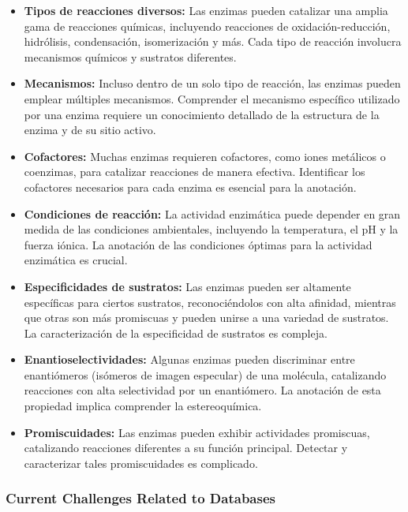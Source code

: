 \documentclass[12pt]{article}
\begin{document}
\begin{itemize}
\item \textbf{Tipos de reacciones diversos:} Las enzimas pueden catalizar una amplia gama de reacciones químicas, incluyendo reacciones de oxidación-reducción, hidrólisis, condensación, isomerización y más. Cada tipo de reacción involucra mecanismos químicos y sustratos diferentes.

\item \textbf{Mecanismos:} Incluso dentro de un solo tipo de reacción, las enzimas pueden emplear múltiples mecanismos. Comprender el mecanismo específico utilizado por una enzima requiere un conocimiento detallado de la estructura de la enzima y de su sitio activo.

\item \textbf{Cofactores:} Muchas enzimas requieren cofactores, como iones metálicos o coenzimas, para catalizar reacciones de manera efectiva. Identificar los cofactores necesarios para cada enzima es esencial para la anotación.

\item \textbf{Condiciones de reacción:} La actividad enzimática puede depender en gran medida de las condiciones ambientales, incluyendo la temperatura, el pH y la fuerza iónica. La anotación de las condiciones óptimas para la actividad enzimática es crucial.

\item \textbf{Especificidades de sustratos:} Las enzimas pueden ser altamente específicas para ciertos sustratos, reconociéndolos con alta afinidad, mientras que otras son más promiscuas y pueden unirse a una variedad de sustratos. La caracterización de la especificidad de sustratos es compleja.

\item \textbf{Enantioselectividades:} Algunas enzimas pueden discriminar entre enantiómeros (isómeros de imagen especular) de una molécula, catalizando reacciones con alta selectividad por un enantiómero. La anotación de esta propiedad implica comprender la estereoquímica.

\item \textbf{Promiscuidades:} Las enzimas pueden exhibir actividades promiscuas, catalizando reacciones diferentes a su función principal. Detectar y caracterizar tales promiscuidades es complicado.
\end{itemize}

\subsubsection{Current Challenges Related to Databases}
\end{document}
